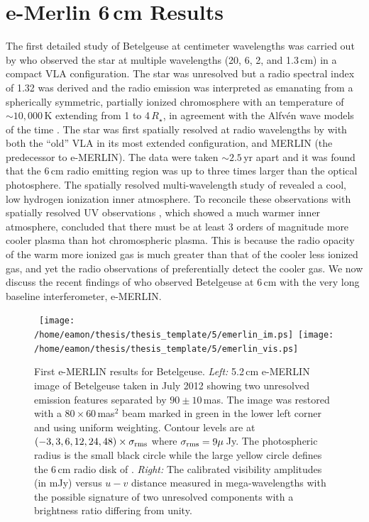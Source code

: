 \section{e-Merlin 6\,cm Results}\label{sec:5.12}
The first detailed study of Betelgeuse at centimeter wavelengths was carried out by \cite{newell_1982}
who observed the star at multiple wavelengths (20, 6, 2, and 1.3\,cm) in a compact VLA configuration. The star was unresolved but a radio spectral index of 1.32 was derived and the radio emission was interpreted as emanating from a spherically symmetric, partially ionized chromosphere with an temperature of  $\sim 10,000$\,K extending from 1 to 4\,$R_{\star}$, in agreement with the Alfv\'en wave models of the time \citep{hartmann_1984}. The star was first spatially resolved at radio wavelengths by \cite{skinner_1997} with both the ``old'' VLA in its most extended configuration, and MERLIN (the predecessor to e-MERLIN). The data were taken $\sim 2.5$\,yr apart and it was found that the 6\,cm radio emitting region was up to three times larger than the optical photosphere. The spatially resolved multi-wavelength study of \cite{lim_1998} revealed a cool, low hydrogen ionization inner atmosphere. To reconcile these observations with spatially resolved UV observations \cite{gilliland_1996}, which showed a much warmer inner atmosphere, \cite{lim_1998} concluded that there must be at least 3 orders of magnitude more cooler plasma than hot chromospheric plasma. This is because the radio opacity of the warm more ionized gas is much greater than that of the cooler less ionized gas, and yet the radio observations of \cite{lim_1998} preferentially detect the cooler gas. We now discuss the recent findings of \cite{richards_2013} who observed Betelgeuse at 6\,cm with the very long baseline interferometer, e-MERLIN.

\begin{figure}[!ht]
\centering 
\mbox{
          \texttt{[image: /home/eamon/thesis/thesis\_template/5/emerlin\_im.ps]}
          \texttt{[image: /home/eamon/thesis/thesis\_template/5/emerlin\_vis.ps]}
          }
\caption[First e-MERLIN results for Betelgeuse]{First e-MERLIN results for Betelgeuse. \textit{Left:} 5.2\,cm e-MERLIN image of Betelgeuse taken in July 2012 showing two unresolved emission features separated by $90\pm10$\,mas. The image was restored with a $80\times 60$\,mas$^2$ beam marked in green in the lower left corner and using uniform weighting. Contour levels are at $(-3, 3, 6, 12, 24, 48)\times \sigma _{\rm{rms}}$ where $\sigma _{\rm{rms}} = 9\mu$\,Jy. The photospheric radius is the small black circle while the large yellow circle defines the 6\,cm radio disk of \cite{lim_1998}. \textit{Right:} The calibrated visibility amplitudes (in mJy) versus $u-v$ distance measured in mega-wavelengths with the possible signature of two unresolved components with a brightness ratio differing from unity. }
\label{fig:5.13}
\end{figure}

